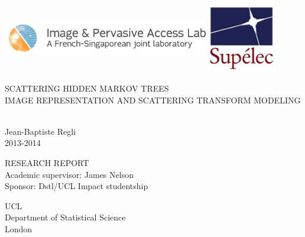 \documentclass[a4paper,11pt]{report}
\begin{document}
	
	\begin{titlepage}
		\hspace{-1.5cm}\includegraphics[width=9cm,height= 3cm]{Images/Miscellaneous/IPAL_2.png}
		\hfill{
			\raggedleft \includegraphics[width=3cm]{Images/Miscellaneous/supelec.png}
			}
		\vspace*{5cm}
	
		\begin{center}
			\begin{sc} 	
				\huge SCATTERING HIDDEN MARKOV TREES
				\vspace*{0.2cm}
				\\ \large IMAGE REPRESENTATION AND SCATTERING TRANSFORM MODELING
				\vspace*{2cm}
			\end{sc}
			\\ \LARGE Jean-Baptiste Regli
			\vspace*{0.2cm}
			\\ \large 2013-2014
		\end{center}

		\vfill
		\begin{center}
			\vspace*{1cm}
			\Large RESEARCH REPORT
			\vspace*{0.5cm}
			\\ \large Academic supervisor: James Nelson 
			\\ \large Sponsor: Dstl/UCL Impact studentship
			
			\vspace*{1cm}
			\Large UCL
			\\ \normalsize Department of Statistical Science
			\\ London
		\end{center}
	\end{titlepage}
	\clearpage
\end{document}
